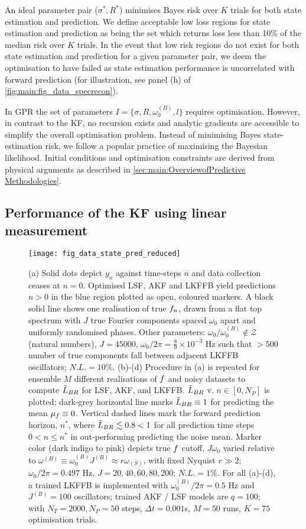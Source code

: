 An ideal parameter pair ($\sigma^*, R^*$) minimises Bayes risk over $K$ trials for both state estimation and prediction.  We define acceptable low loss regions for state estimation and prediction as being the set which returns loss less than 10\% of the median risk over $K$ trials.  In the event that low risk regions do not exist for both state estimation and prediction for a given parameter pair, we deem the optimisation to have failed as state estimation performance is uncorrelated with forward prediction (for illustration, see panel (h) of \cref{fig:main:fig_data_specrecon}).

In GPR the set of parameters $I = \{\sigma, R, \omega_0^{(B)}, l \}$ requires optimisation.  However, in contrast to the KF, no recursion exists and analytic gradients are accessible to simplify the overall optimisation problem. Instead of minimising Bayes state-estimation risk, we follow a popular practice of maximising the Bayesian likelihood. Initial conditions and optimisation constraints are derived from physical arguments as described in \cref{sec:main:OverviewofPredictive Methodologies}.

\subsection{Performance of the KF using linear measurement}
\begin{figure}
	\texttt{[image: fig\_data\_state\_pred\_reduced]}
	\caption{\label{fig:main:fig_data_state_pred} (a) Solid dots depict $y_n$ against time-steps $n$ and data collection ceases at $n=0$. Optimised LSF, AKF and LKFFB yield predictions $n>0$ in the blue region plotted as open, coloured markers. A black solid line shows one realisation of true $f_n$, drawn from a flat top spectrum with $J$ true Fourier components spaced $\omega_0$ apart and uniformly randomised phases. Other parameters: $\omega_0 / \omega_0^{(B)}  \notin \mathcal{Z}$ (natural numbers), $J = 45000$, $\omega_0 / 2\pi = \frac{8}{9} \times 10^{-3}$ Hz such that $>500$ number of true components fall between adjacent LKFFB oscillators; $ N.L.= 10\%$. (b)-(d) Procedure in (a) is repeated for ensemble $M$ different realisations of $f$ and noisy datasets to compute $\tilde{L}_{BR}$ for LSF, AKF, and LKFFB. $\tilde{L}_{BR}$ v. $n \in [0, N_P]$ is plotted; dark-grey horizontal line marks $\tilde{L}_{BR} \equiv 1$ for predicting the mean $\mu_f \equiv 0$. Vertical dashed lines mark the forward prediction horizon, $ n^* $, where $  \tilde{L}_{BR} \lesssim 0.8 < 1$ for all prediction time steps  $0< n \leq n^*$ in out-performing predicting the noise mean. Marker color (dark indigo to pink) depicts true $f$ cutoff, $J\omega_0$ varied relative to $\omega^{(B)} \equiv \omega_0^{(B)}J^{(B)} \approx r \omega_{(S)}$, with fixed Nyquist $r\gg2$; $\omega_0 / 2\pi = 0.497$ Hz, $J = 20, 40, 60, 80, 200$; $N.L. = 1\%$.  For all (a)-(d), a trained LKFFB is implemented with $\omega_0^{(B)} / 2\pi = 0.5$ Hz and $J^{(B)} =100$ oscillators; trained AKF / LSF models are $q = 100$; with $N_T = 2000, N_P = 50$ steps, $\Delta t = 0.001$s, $M=50$ runs, $K=75$ optimisation trials.} 
\end{figure}  


